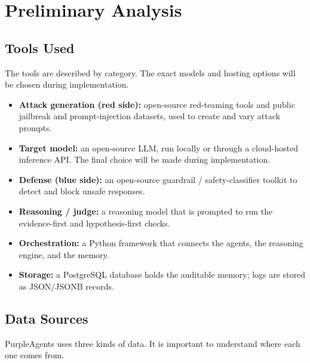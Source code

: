 \chapter{Preliminary Analysis}
\label{ch:analysis}

\section{Tools Used}

The tools are described by category. The exact models and hosting options will
be chosen during implementation.

\begin{itemize}
  \item \textbf{Attack generation (red side):} open-source red-teaming tools and
  public jailbreak and prompt-injection datasets, used to create and vary attack
  prompts.
  \item \textbf{Target model:} an open-source LLM, run locally or through a
  cloud-hosted inference API. The final choice will be made during
  implementation.
  \item \textbf{Defense (blue side):} an open-source guardrail /
  safety-classifier toolkit to detect and block unsafe responses.
  \item \textbf{Reasoning / judge:} a reasoning model that is prompted to run the
  evidence-first and hypothesis-first checks.
  \item \textbf{Orchestration:} a Python framework that connects the agents, the
  reasoning engine, and the memory.
  \item \textbf{Storage:} a PostgreSQL database holds the auditable memory; logs
  are stored as JSON/JSONB records.
\end{itemize}

\section{Data Sources}

PurpleAgents uses three kinds of data. It is important to understand where each
one comes from.

